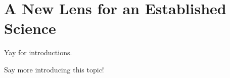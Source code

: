 \section{A New Lens for an Established Science}
\label{sec:new_lens_est_science}

Yay for introductions.
\par
\medskip
Say more introducing this topic!
